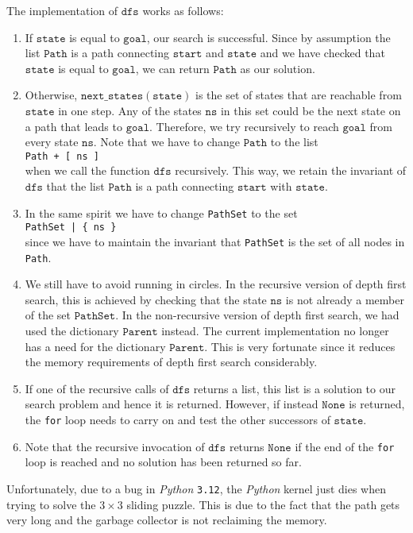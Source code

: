 The implementation of $\texttt{dfs}$ works as follows:
\begin{enumerate}
\item If $\texttt{state}$ is equal to $\texttt{goal}$, our search is successful. Since by assumption
      the list $\texttt{Path}$ is a path connecting $\texttt{start}$ and $\texttt{state}$ and we
      have checked that $\texttt{state}$ is equal to $\texttt{goal}$, we can return $\texttt{Path}$ as our solution.
\item Otherwise, $\texttt{next\_states}(\mathtt{state})$ is the set of states that are reachable from $\texttt{state}$
      in one step.  Any of the states $\texttt{ns}$ in this set could be the next state on a path
      that leads to $\texttt{goal}$.  Therefore, we try recursively to reach $\texttt{goal}$ from
      every state $\texttt{ns}$.  Note that we have to change $\texttt{Path}$ to the list
      \\[0.2cm]
      \hspace*{1.3cm}
      \texttt{Path + [ ns ]}
      \\[0.2cm]
      when we call the function $\texttt{dfs}$ recursively.  This way, we retain the invariant of
      $\texttt{dfs}$ that the list $\texttt{Path}$ is a path connecting $\texttt{start}$ with $\texttt{state}$.
\item In the same spirit we have to change \texttt{PathSet} to the set
      \\[0.2cm]
      \hspace*{1.3cm}
      \texttt{PathSet | \{ ns \}}
      \\[0.2cm]
      since we have to maintain the invariant that \texttt{PathSet} is the set of all nodes in \texttt{Path}.
\item We still have to avoid running in circles.  In the recursive version of depth first search,
      this is achieved by checking that the state $\texttt{ns}$ is not already a member of the set $\texttt{PathSet}$.  In the
      non-recursive version of depth first search, we had used the dictionary $\texttt{Parent}$ instead.
      The current implementation no longer has a need for the dictionary $\texttt{Parent}$.  This is very
      fortunate since it reduces the memory requirements of depth first search considerably.
\item If one of the recursive calls of $\texttt{dfs}$ returns a list, this list is a solution to our
      search problem and hence it is returned.  However, if instead 
      $\texttt{None}$ is returned, the \texttt{for} loop needs to carry on and test the other
      successors of $\texttt{state}$.
\item Note that the recursive invocation of $\texttt{dfs}$ returns $\mathtt{None}$ if the end of the
      \texttt{for} loop is reached and no solution has been returned so far.  
\end{enumerate}
Unfortunately, due to a bug in \textsl{Python} \texttt{3.12}, the \textsl{Python} kernel just dies
when trying to solve the $3 \times 3$ sliding puzzle.  This is due to the fact that the path gets very long and
the garbage collector is not reclaiming the memory.

